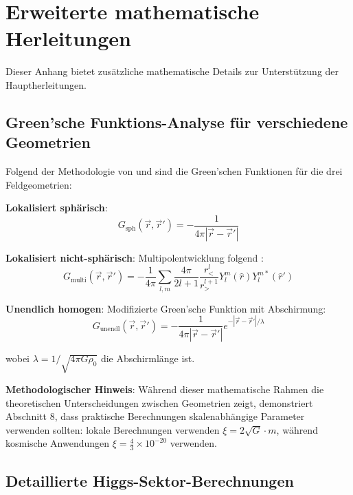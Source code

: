 \documentclass[12pt,a4paper]{article}
\begin{document}
	\section{Erweiterte mathematische Herleitungen}
	\label{app:extended_derivations}
	
	Dieser Anhang bietet zusätzliche mathematische Details zur Unterstützung der Hauptherleitungen.
	
	\subsection{Green'sche Funktions-Analyse für verschiedene Geometrien}
	\label{app:greens_functions}
	
	Folgend der Methodologie von \citet{jackson1998} und \citet{duffy2001} sind die Green'schen Funktionen für die drei Feldgeometrien:
	
	\textbf{Lokalisiert sphärisch}: 
	\begin{equation}
		G_{\text{sph}}(\vec{r},\vec{r}') = -\frac{1}{4\pi|\vec{r}-\vec{r}'|}
	\end{equation}
	
	\textbf{Lokalisiert nicht-sphärisch}: Multipolentwicklung folgend \citet{jackson1998}:
	\begin{equation}
		G_{\text{multi}}(\vec{r},\vec{r}') = -\frac{1}{4\pi} \sum_{l,m} \frac{4\pi}{2l+1} \frac{r_<^l}{r_>^{l+1}} Y_l^m(\hat{r}) Y_l^{m*}(\hat{r}')
	\end{equation}
	
	\textbf{Unendlich homogen}: Modifizierte Green'sche Funktion mit Abschirmung:
	\begin{equation}
		G_{\text{unendl}}(\vec{r},\vec{r}') = -\frac{1}{4\pi|\vec{r}-\vec{r}'|} e^{-|\vec{r}-\vec{r}'|/\lambda}
	\end{equation}
	
	wobei $\lambda = 1/\sqrt{4\pi G \rho_0}$ die Abschirmlänge ist.
	
	\textbf{Methodologischer Hinweis}: Während dieser mathematische Rahmen die theoretischen Unterscheidungen zwischen Geometrien zeigt, demonstriert Abschnitt 8, dass praktische Berechnungen skalenabhängige Parameter verwenden sollten: lokale Berechnungen verwenden $\xi = 2\sqrt{G} \cdot m$, während kosmische Anwendungen $\xi = \frac{4}{3} \times 10^{-20}$ verwenden.
	
	\subsection{Detaillierte Higgs-Sektor-Berechnungen}
	\label{app:higgs_calculations}
	
\end{document}

